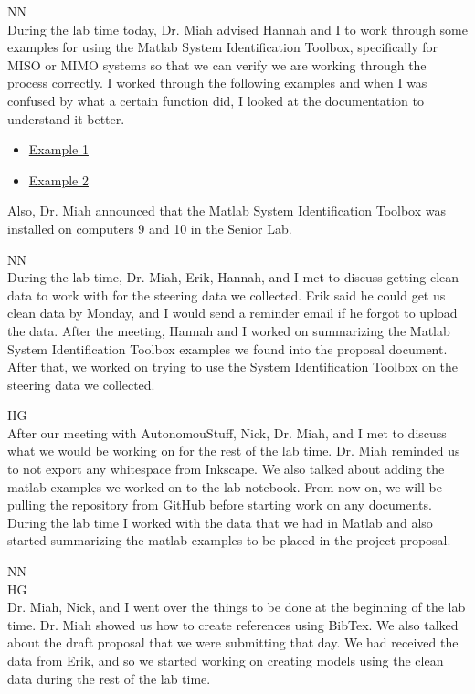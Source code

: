 \documentclass[fontsize=11pt, %
                             paper=letter, %
                             openany, %
                             captions=tableheading,
                             index=totoc,
                             hyperref]{labbook}
\def\currentYear{2021}
\begin{document}
\begin{addmargin}[0cm]{0cm}
NN\\
During the lab time today, Dr. Miah advised Hannah and I to work through some examples for using the Matlab System Identification Toolbox, specifically for MISO or MIMO systems so that we can verify we are working through the process correctly. I worked through the following examples and when I was confused by what a certain function did, I looked at the documentation to understand it better. 
\begin{itemize}
	\item \href{https://www.mathworks.com/help/ident/ug/dealing-with-multi-variable-systems-identification-and-analysis.html}{Example 1}
	\item \href{http://www.ece.northwestern.edu/local-apps/matlabhelp/toolbox/ident/ch3tut44.html}{Example 2}
\end{itemize}

Also, Dr. Miah announced that the Matlab System Identification Toolbox was installed on computers 9 and 10 in the Senior Lab.

\labday{Thursday, October 28, \currentYear}
NN\\
During the lab time, Dr. Miah, Erik, Hannah, and I met to discuss getting clean data to work with for the steering data we collected. Erik said he could get us clean data by Monday, and I would send a reminder email if he forgot to upload the data. After the meeting, Hannah and I worked on summarizing the Matlab System Identification Toolbox examples we found into the proposal document. After that, we worked on trying to use the System Identification Toolbox on the steering data we collected.

HG\\
After our meeting with AutonomouStuff, Nick, Dr. Miah, and I met to discuss what we would be working on for the rest of the lab time. Dr. Miah reminded us to not export any whitespace from Inkscape. We also talked about adding the matlab examples we worked on to the lab notebook. From now on, we will be pulling the repository from GitHub before starting work on any documents. During the lab time I worked with the data that we had in Matlab and also started summarizing the matlab examples to be placed in the project proposal. 

NN\\


\labday{Tuesday, November 2, \currentYear}
HG\\
Dr. Miah, Nick, and I went over the things to be done at the beginning of the lab time. Dr. Miah showed us how to create references using BibTex. We also talked about the draft proposal that we were submitting that day. We had received the data from Erik, and so we started working on creating models using the clean data during the rest of the lab time. 


\end{addmargin}
\end{document}

